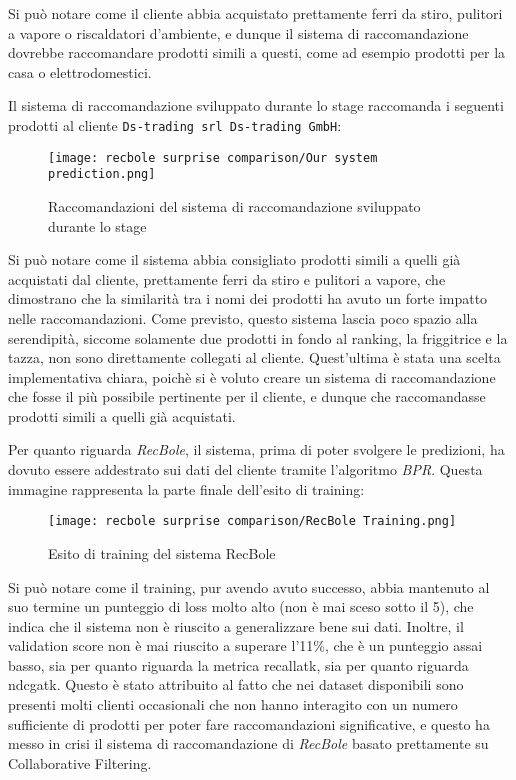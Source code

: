 Si può notare come il cliente abbia acquistato prettamente ferri da stiro, pulitori a vapore o riscaldatori d'ambiente, e dunque il sistema di raccomandazione dovrebbe raccomandare prodotti simili a questi, come ad esempio prodotti per la casa o elettrodomestici.

Il sistema di raccomandazione sviluppato durante lo stage raccomanda i seguenti prodotti al cliente \texttt{Ds-trading srl Ds-trading GmbH}:

\begin{figure}[h]
    \centering
    \texttt{[image: recbole surprise comparison/Our system prediction.png]}
    \caption{Raccomandazioni del sistema di raccomandazione sviluppato durante lo stage}
    \label{fig:our-system-recommendations}
\end{figure}

Si può notare come il sistema abbia consigliato prodotti simili a quelli già acquistati dal cliente, prettamente ferri da stiro e pulitori a vapore, che dimostrano che la similarità tra i nomi dei prodotti ha avuto un forte impatto nelle raccomandazioni. Come previsto, questo sistema lascia poco spazio alla serendipità, siccome solamente due prodotti in fondo al ranking, la friggitrice e la tazza, non sono direttamente collegati al cliente. Quest'ultima è stata una scelta implementativa chiara, poichè si è voluto creare un sistema di raccomandazione che fosse il più possibile pertinente per il cliente, e dunque che raccomandasse prodotti simili a quelli già acquistati.

Per quanto riguarda \emph{RecBole}, il sistema, prima di poter svolgere le predizioni, ha dovuto essere addestrato sui dati del cliente tramite l'algoritmo \emph{BPR}. Questa immagine rappresenta la parte finale dell'esito di training:

\begin{figure}[h]
    \centering
    \texttt{[image: recbole surprise comparison/RecBole Training.png]}
    \caption{Esito di training del sistema RecBole}
    \label{fig:recbole-training-outcome}
\end{figure}

Si può notare come il training, pur avendo avuto successo, abbia mantenuto al suo termine un punteggio di loss molto alto (non è mai sceso sotto il 5), che indica che il sistema non è riuscito a generalizzare bene sui dati. Inoltre, il validation score non è mai riuscito a superare l'11\%, che è un punteggio assai basso, sia per quanto riguarda la metrica \gls{recallatk}, sia per quanto riguarda \gls{ndcgatk}. Questo è stato attribuito al fatto che nei dataset disponibili sono presenti molti clienti occasionali che non hanno interagito con un numero sufficiente di prodotti per poter fare raccomandazioni significative, e questo ha messo in crisi il sistema di raccomandazione di \emph{RecBole} basato prettamente su Collaborative Filtering.

